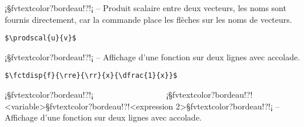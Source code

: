 \documentclass[11pt,a4paper,rgb]{report}
\begin{document}
\setlength{\leftskip}{0pt}
\setlength{\textwidth}{18cm}%


\vspace*{.75cm}

\inCodeStub¡§fvtextcolor?bordeau!?!¡ -- Produit scalaire entre deux vecteurs, les noms sont fournis directement, car la commande place les flèches sur les noms de vecteurs.

\setlength{\leftskip}{.75cm}%
\setlength{\textwidth}{17.25cm}%

\colorbox{blue!15}{}
\hfill
\begin{minipage}{.65\textwidth}
	\begin{lstlisting}[linewidth=\textwidth, language={[LaTeX]TeX}]
	$\prodscal{u}{v}$
	\end{lstlisting}
\end{minipage}

\setlength{\leftskip}{0pt}
\setlength{\textwidth}{18cm}%


\vspace*{.75cm}

\inCodeStub¡§fvtextcolor?bordeau!?!¡ -- Affichage d'une fonction sur deux lignes avec accolade.

\setlength{\leftskip}{.75cm}%
\setlength{\textwidth}{17.25cm}%

\colorbox{blue!15}{}
\hfill
\begin{minipage}{.65\textwidth}
	\begin{lstlisting}[linewidth=\textwidth, language={[LaTeX]TeX}]
	$\fctdisp{f}{\rre}{\rr}{x}{\dfrac{1}{x}}$
	\end{lstlisting}
\end{minipage}

\setlength{\leftskip}{0pt}
\setlength{\textwidth}{18cm}%


\vspace*{.75cm}

\inCodeStub¡§fvtextcolor?bordeau!?!¡\newline
\phantom{i}~~~~~~~~~~~~~~~~~\inCodeStub¡§fvtextcolor?bordeau!?{!<variable>§fvtextcolor?bordeau!?}{!<expression 2>§fvtextcolor?bordeau!?}!¡ -- Affichage d'une fonction sur deux lignes avec accolade.
\end{document}
